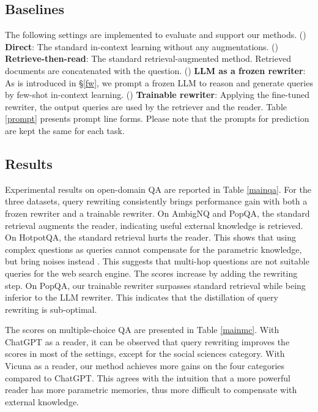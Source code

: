 \subsection{Baselines}
The following settings are implemented to evaluate and support our methods.
() \textbf{Direct}:
The standard in-context learning without any augmentations. 
() \textbf{Retrieve-then-read}:
The standard retrieval-augmented method. Retrieved documents are concatenated with the question.
() \textbf{LLM as a frozen rewriter}:
As is introduced in \S \ref{fw}, we prompt a frozen LLM to reason and generate queries by few-shot in-context learning. 
() \textbf{Trainable rewriter}:
Applying the fine-tuned rewriter, the output queries are used by the retriever and the reader. 
Table \ref{prompt} presents prompt line forms. Please note that the prompts for prediction are kept the same for each task.

\subsection{Results}
Experimental results on open-domain QA are reported in Table \ref{mainqa}.
For the three datasets, query rewriting consistently brings performance gain with both a frozen rewriter and a trainable rewriter.
On AmbigNQ and PopQA, the standard retrieval augments the reader, indicating useful external knowledge is retrieved.
On HotpotQA, the standard retrieval hurts the reader. This shows that using complex questions as queries cannot compensate for the parametric knowledge, but bring noises instead \cite{mallen2023llm_memorization}.
This suggests that multi-hop questions are not suitable queries for the web search engine.
The scores increase by adding the rewriting step.
On PopQA, our trainable rewriter surpasses standard retrieval while being inferior to the LLM rewriter.
This indicates that the distillation of query rewriting is sub-optimal.

The scores on multiple-choice QA are presented in Table \ref{mainmc}.
With ChatGPT as a reader, it can be observed that query rewriting improves the scores in most of the settings, except for the social sciences category.
With Vicuna as a reader, our method achieves more gains on the four categories compared to ChatGPT.
This agrees with the intuition that a more powerful reader has more parametric memories, thus more difficult to compensate with external knowledge.

